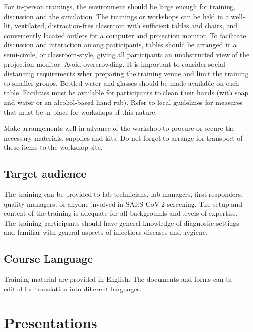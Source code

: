 \documentclass[
]{book}
\begin{document}
For in-person trainings, the environment should be large enough for
training, discussion and the simulation. The trainings or workshops can
be held in a well-lit, ventilated, distraction-free classroom with
sufficient tables and chairs, and conveniently located outlets for a
computer and projection monitor. To facilitate discussion and
interaction among participants, tables should be arranged in a
semi-circle, or classroom-style, giving all participants an unobstructed
view of the projection monitor. Avoid overcrowding. It is important to
consider social distancing requirements when preparing the training
venue and limit the training to smaller groups. Bottled water and
glasses should be made available on each table. Facilities must be
available for participants to clean their hands (with soap and water or
an alcohol-based hand rub). Refer to local guidelines for measures that
must be in place for workshops of this nature.

Make arrangements well in advance of the workshop to procure or secure
the necessary materials, supplies and kits. Do not forget to arrange for
transport of these items to the workshop site.

\hypertarget{target}{%
\section{Target audience}\label{target}}

The training can be provided to lab technicians, lab managers, first
responders, quality managers, or anyone involved in SARS-CoV-2
screening. The setup and content of the training is adequate for all
backgrounds and levels of expertise. The training participants should
have general knowledge of diagnostic settings and familiar with general
aspects of infectious diseases and hygiene.

\hypertarget{course-language}{%
\section{Course Language}\label{course-language}}

Training material are provided in English. The documents and forms can
be edited for translation into different languages.

\hypertarget{presentations}{%
\chapter{Presentations}\label{presentations}}
\end{document}
